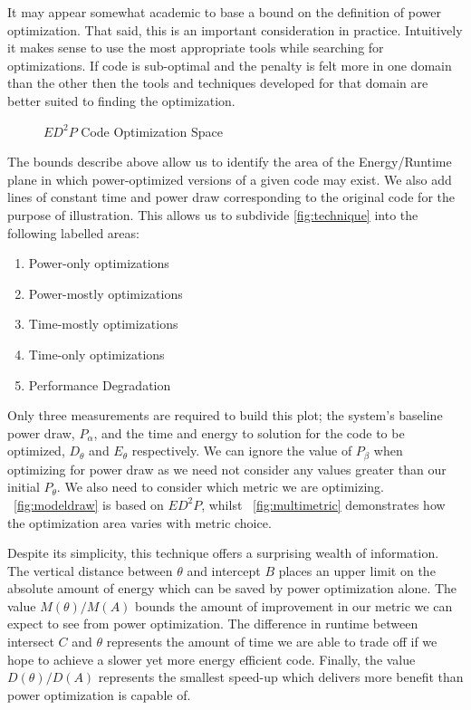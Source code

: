 It may appear somewhat academic to base a bound on the definition of power optimization. That said, this is an important consideration in practice. Intuitively it makes sense to use the most appropriate tools while searching for optimizations. If code is sub-optimal and the penalty is felt more in one domain than the other then the tools and techniques developed for that domain are better suited to finding the optimization.

\begin{figure}
\centering

\caption{$ED^2P$ Code Optimization Space}
\label{fig:technique}
\end{figure}
The bounds describe above allow us to identify the area of the Energy/Runtime plane in which power-optimized versions of a given code may exist. We also add lines of constant time and power draw corresponding to the original code for the purpose of illustration. This allows us to subdivide \autoref{fig:technique} into the following labelled areas:
\begin{enumerate}
\item Power-only optimizations
\item Power-mostly optimizations
\item Time-mostly optimizations
\item Time-only optimizations
\item Performance Degradation
\end{enumerate}

Only three measurements are required to build this plot; the system's baseline power draw, $P_\alpha$, and the time and energy to solution for the code to be optimized, $D_\theta$ and $E_\theta$ respectively. We can ignore the value of $P_\beta$ when optimizing for power draw as we need not consider any values greater than our initial $P_\theta$. We also need to consider which metric we are optimizing. \figurename~\ref{fig:modeldraw} is based on $ED^2P$, whilst \figurename~\ref{fig:multimetric} demonstrates how the optimization area varies with metric choice.

Despite its simplicity, this technique offers a surprising wealth of information. The vertical distance between $\theta$ and intercept $B$ places an upper limit on the absolute amount of energy which can be saved by power optimization alone. The value $M(\theta) / M(A)$ bounds the amount of improvement in our metric we can expect to see from power optimization. The difference in runtime between intersect $C$ and $\theta$ represents the amount of time we are able to trade off if we hope to achieve a slower yet more energy efficient code. Finally, the value $D(\theta) / D(A)$ represents the smallest speed-up which delivers more benefit than power optimization is capable of.

